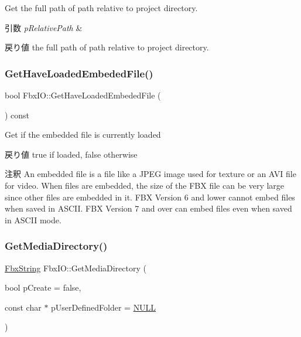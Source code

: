 Get the full path of path relative to project directory. 
\begin{DoxyParams}{引数}
{\em p\+Relative\+Path} & \\
\hline
\end{DoxyParams}
\begin{DoxyReturn}{戻り値}
the full path of path relative to project directory. 
\end{DoxyReturn}
\mbox{\label{class_fbx_i_o_a4280b5f11fdc101c7bd82da1649b7752}} 
\subsubsection{\texorpdfstring{Get\+Have\+Loaded\+Embeded\+File()}{GetHaveLoadedEmbededFile()}}
{\footnotesize\ttfamily bool Fbx\+I\+O\+::\+Get\+Have\+Loaded\+Embeded\+File (\begin{DoxyParamCaption}{ }\end{DoxyParamCaption}) const}

Get if the embedded file is currently loaded \begin{DoxyReturn}{戻り値}
true if loaded, false otherwise 
\end{DoxyReturn}
\begin{DoxyRemark}{注釈}
An embedded file is a file like a J\+P\+EG image used for texture or an A\+VI file for video. When files are embedded, the size of the F\+BX file can be very large since other files are embedded in it. F\+BX Version 6 and lower cannot embed files when saved in A\+S\+C\+II. F\+BX Version 7 and over can embed files even when saved in A\+S\+C\+II mode. 
\end{DoxyRemark}
\mbox{\label{class_fbx_i_o_a484ddca5870fbd463e7cec6141993abc}} 
\subsubsection{\texorpdfstring{Get\+Media\+Directory()}{GetMediaDirectory()}}
{\footnotesize\ttfamily \hyperlink{class_fbx_string}{Fbx\+String} Fbx\+I\+O\+::\+Get\+Media\+Directory (\begin{DoxyParamCaption}\item[{bool}]{p\+Create = {\ttfamily false},  }\item[{const char $\ast$}]{p\+User\+Defined\+Folder = {\ttfamily \hyperlink{fbxarch_8h_a070d2ce7b6bb7e5c05602aa8c308d0c4}{N\+U\+LL}} }\end{DoxyParamCaption})}

